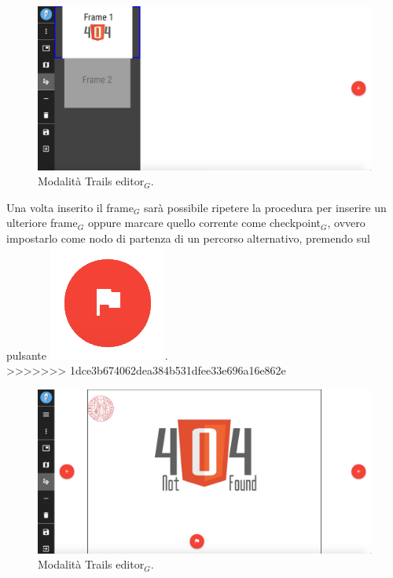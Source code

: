 \begin{figure}[!h]
\begin{center}
\includegraphics[scale=0.35]{img/trail_frames_list.png}
\caption{Modalità Trails editor$_G$.}
\end{center}
\end{figure}

Una volta inserito il frame$_G$ sarà possibile ripetere la procedura per inserire un ulteriore frame$_G$ oppure marcare quello corrente come checkpoint$_G$, ovvero impostarlo come nodo di partenza di un percorso alternativo, premendo sul pulsante \includegraphics[scale=0.4]{img/checkpoint.png}.\\

>>>>>>> 1dce3b674062dea384b531dfee33e696a16e862e
\begin{figure}[!h]
\begin{center}
\includegraphics[scale=0.35]{img/trail_frame.png}
\caption{Modalità Trails editor$_G$.}
\end{center}
\end{figure}

